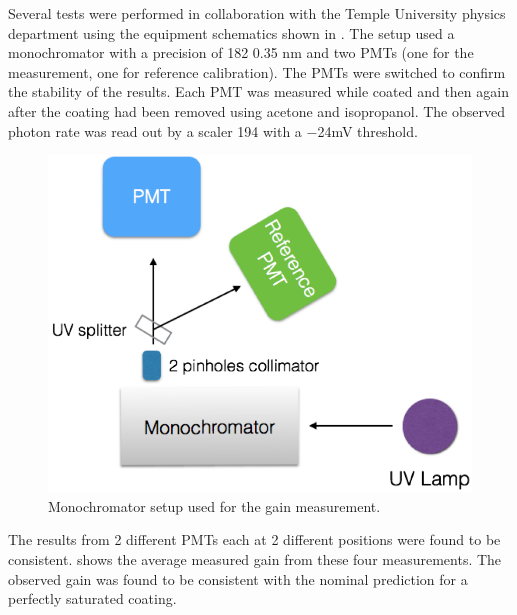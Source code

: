 Several tests were performed in collaboration with the Temple University physics department using the equipment schematics
shown in . The setup used a monochromator with a precision of 182 0.35 nm and two PMTs (one for the measurement,
one for reference calibration). The PMTs were switched to confirm the stability of the results. Each PMT was measured
while coated and then again after the coating had been removed using acetone and isopropanol.
The observed photon rate was read out by a scaler 194 with a −24mV threshold.

\begin{figure}
	\centering
	\includegraphics[width=0.95\columnwidth,keepaspectratio]{img/pmtTestingSetup.png}
	\caption{Monochromator setup used for the gain measurement.}
	\label{fig:pmtTestingSetup}
\end{figure}

The results from 2 different PMTs each at 2 different positions were found to be
consistent.  shows the average measured gain from these four
measurements. The observed gain was found to be consistent with the nominal
prediction for a perfectly saturated coating.

